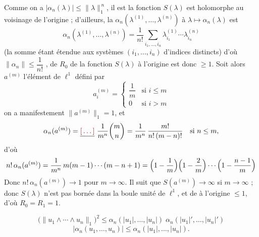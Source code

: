 \documentclass[11pt,a4paper]{article}
\begin{document}
Comme on a $|\alpha_n(\lambda)| \leq \|\lambda\|_1^{\,n}$, il est \ill{}  la fonction $S(\lambda)$ est holomorphe au voisinage de l'origine ; d'ailleurs, la  \ill{}  $\alpha_n(\lambda^{(1)}, \ldots, \lambda^{(n)})$  à $\lambda \mapsto \alpha_n(\lambda)$ est
\[
  \alpha_n(\lambda^{(1)}, \ldots, \lambda^{(n)}) = \frac{1}{n!} \sum_{i_1, \ldots, i_n} \lambda^{(1)}_{i_1} \cdots \lambda^{(n)}_{i_n}
\]
(la somme étant étendue aux systèmes $(i_1, \ldots, i_n)$ d'indices  distincts) d'où $\|\alpha_n\| \leq \dfrac{1}{n!}$   ,   de  \ill{} $R_0$  de la fonction $S(\lambda)$ à l'origine est donc $\geq 1$. Soit alors $a^{(m)}$ l'élément de $\ell^1$ défini par
\[
  a^{(m)}_i = \begin{cases} \dfrac{1}{m} & \text{si } i \leq m \\[4pt] 0 & \text{si } i > m \end{cases}
\]
on a manifestement $\|a^{(m)}\|_1 = 1$, et
\[
  \alpha_n(a^{(m)}) = \struck{\ill{}}\ \frac{1}{m^n}\binom{m}{n} = \frac{1}{m^n}\,\frac{m!}{n!\,(m-n)!} \quad \text{si } n \leq m,
\]
 d'où
\[
  n!\,\alpha_n(a^{(m)}) = \frac{1}{m^n}\, m(m-1)\cdots(m-n+1) = \Bigl(1 - \frac{1}{m}\Bigr)\Bigl(1 - \frac{2}{m}\Bigr)\cdots\Bigl(1 - \frac{n-1}{m}\Bigr)
\]
Donc $n!\,\alpha_n(a^{(m)}) \to 1$ pour $m \to \infty$. Il suit que $S(a^{(m)}) \to \infty$ si $m \to \infty$ ; donc $S(\lambda)$ n'est pas bornée dans la boule unité de $\ell^1$, et   de  \ill{}   à l'origine    $\leq 1$, d'où $R_0 = R_1 = 1$.  

\[
  \bigl(\|u_1 \wedge \cdots \wedge u_n\|_1\bigr)^2 \leq \alpha_n(|u_1|, \ldots, |u_n|)\; \alpha_n(|u_1|', \ldots, |u_n|')
\]
\[
  |\alpha_n(u_1, \ldots, u_n)| \leq \alpha_n(|u_1|, \ldots, |u_n|).
\]
\end{document}
